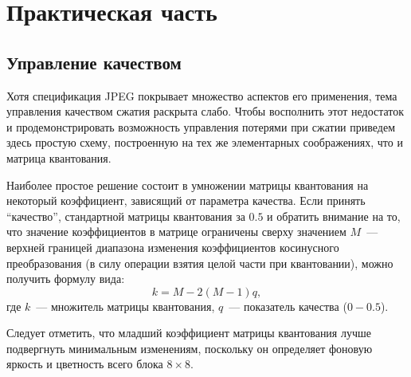 \documentclass[12pt,a4paper]{article}
\begin{document}

    \section{Практическая часть}


        \subsection{Управление качеством}

            Хотя спецификация JPEG покрывает множество аспектов его применения, тема управления качеством сжатия раскрыта слабо. Чтобы восполнить этот недостаток и продемонстрировать возможность управления потерями при сжатии приведем здесь простую схему, построенную на тех же элементарных соображениях, что и матрица квантования.

            Наиболее простое решение состоит в умножении матрицы квантования на некоторый коэффициент, зависящий от параметра качества. Если принять \enquote{качество}, стандартной матрицы квантования за $0.5$ и обратить внимание на то, что значение коэффициентов в матрице ограничены сверху значением $M$~--- верхней границей диапазона изменения коэффициентов косинусного преобразования (в силу операции взятия целой части при квантовании), можно получить формулу вида:
            \begin{equation*}
                k = M - 2 (M - 1) q,
            \end{equation*}
            где $k$~--- множитель матрицы квантования, $q$~--- показатель качества ($0-0.5$).

            Следует отметить, что младший коэффициент матрицы квантования лучше подвергнуть минимальным изменениям, поскольку он определяет фоновую яркость и цветность всего блока $8\times 8$.

\end{document}
